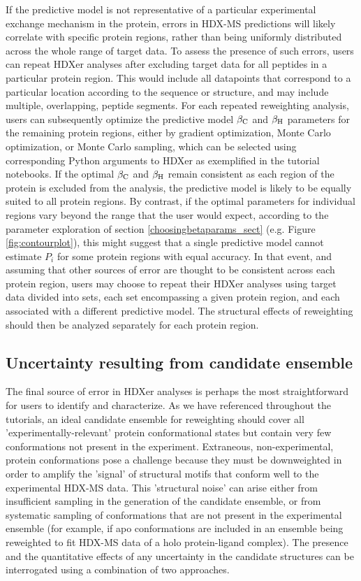 \documentclass[9pt,tutorial]{livecoms}
\begin{document}
If the predictive model is not representative of a particular experimental exchange mechanism in the protein, errors in HDX-MS predictions will likely correlate with specific protein regions, rather than being uniformly distributed across the whole range of target data.
To assess the presence of such errors, users can repeat HDXer analyses after excluding target data for all peptides in a particular protein region.
This would include all datapoints that correspond to a particular location according to the sequence or structure, and may include multiple, overlapping, peptide segments.
For each repeated reweighting analysis, users can subsequently optimize the predictive model $\beta_\textnormal{C}$ and $\beta_\textnormal{H}$ parameters for the remaining protein regions, either by gradient optimization, Monte Carlo optimization, or Monte Carlo sampling, which can be selected using corresponding Python arguments to HDXer as exemplified in the tutorial notebooks.
If the optimal $\beta_\textnormal{C}$ and $\beta_\textnormal{H}$ remain consistent as each region of the protein is excluded from the analysis, the predictive model is likely to be equally suited to all protein regions.
By contrast, if the optimal parameters for individual regions vary beyond the range that the user would expect, according to the parameter exploration of section \ref{choosingbetaparams_sect} (e.g. Figure \ref{fig:contourplot}), this might suggest that a single predictive model cannot estimate $P_i$ for some protein regions with equal accuracy.
In that event, and assuming that other sources of error are thought to be consistent across each protein region, users may choose to repeat their HDXer analyses using target data divided into sets, each set encompassing a given protein region, and each associated with a different predictive model.
The structural effects of reweighting should then be analyzed separately for each protein region.

\subsection{Uncertainty resulting from candidate ensemble}\label{ensemble_uncertainty_sect}
The final source of error in HDXer analyses is perhaps the most straightforward for users to identify and characterize.
As we have referenced throughout the tutorials, an ideal candidate ensemble for reweighting should cover all 'experimentally-relevant' protein conformational states but contain very few conformations not present in the experiment.
Extraneous, non-experimental, protein conformations pose a challenge because they must be downweighted in order to amplify the 'signal' of structural motifs that conform well to the experimental HDX-MS data.
This 'structural noise' can arise either from insufficient sampling in the generation of the candidate ensemble, or from systematic sampling of conformations that are not present in the experimental ensemble (for example, if apo conformations are included in an ensemble being reweighted to fit HDX-MS data of a holo protein-ligand complex).
The presence and the quantitative effects of any uncertainty in the candidate structures can be interrogated using a combination of two approaches.
\end{document}
